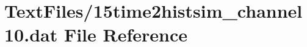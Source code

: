 \hypertarget{15time2histsim__channel10_8dat}{}\section{Text\+Files/15time2histsim\+\_\+channel10.dat File Reference}
\label{15time2histsim__channel10_8dat}

